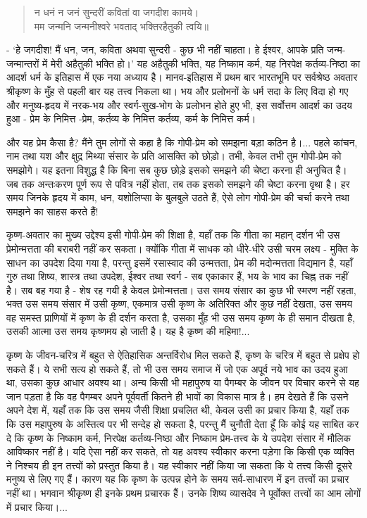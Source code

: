 \begin{verse}
न धनं न जनं सुन्दरीं कवितां वा जगदीश कामये।\\मम जन्मनि जन्मनीश्वरे भवताद् भक्तिरहैतुकी त्वयि॥ 
\end{verse}

- ‘हे जगदीश! मैं धन, जन, कविता अथवा सुन्दरी - कुछ भी नहीं चाहता। हे ईश्वर, आपके प्रति जन्म-जन्मान्तरों में मेरी अहैतुकी भक्ति हो।’ यह अहैतुकी भक्ति, यह निष्काम कर्म, यह निरपेक्ष कर्तव्य-निष्ठा का आदर्श धर्म के इतिहास में एक नया अध्याय है। मानव-इतिहास में प्रथम बार भारतभूमि पर सर्वश्रेष्ठ अवतार श्रीकृष्ण के मुँह से पहली बार यह तत्त्व निकला था। भय और प्रलोभनों के धर्म सदा के लिए विदा हो गए और मनुष्य-हृदय में नरक-भय और स्वर्ग-सुख-भोग के प्रलोभन होते हुए भी, इस सर्वोत्तम आदर्श का उदय हुआ - प्रेम के निमित्त -प्रेम, कर्तव्य के निमित्त कर्तव्य, कर्म के निमित्त कर्म। 

और यह प्रेम कैसा है? मैंने तुम लोगों से कहा है कि गोपी-प्रेम को समझना बड़ा कठिन है।... पहले कांचन, नाम तथा यश और क्षुद्र मिथ्या संसार के प्रति आसक्ति को छोड़ो। तभी, केवल तभी तुम गोपी-प्रेम को समझोगे। यह इतना विशुद्ध है कि बिना सब कुछ छोड़े इसको समझने की चेष्टा करना ही अनुचित है। जब तक अन्तःकरण पूर्ण रूप से पवित्र नहीं होता, तब तक इसको समझने की चेष्टा करना वृथा है। हर समय जिनके हृदय में काम, धन, यशोलिप्सा के बुलबुले उठते हैं, ऐसे लोग गोपी-प्रेम की चर्चा करने तथा समझने का साहस करते हैं! 

कृष्ण-अवतार का मुख्य उद्देश्य इसी गोपी-प्रेम की शिक्षा है, यहाँ तक कि गीता का महान् दर्शन भी उस प्रेमोन्मत्तता की बराबरी नहीं कर सकता। क्योंकि गीता में साधक को धीरे-धीरे उसी चरम लक्ष्य - मुक्ति के साधन का उपदेश दिया गया है, परन्तु इसमें रसास्वाद की उन्मत्तता, प्रेम की मदोन्मत्तता विद्यमान है, यहाँ गुरु तथा शिष्य, शास्त्र तथा उपदेश, ईश्वर तथा स्वर्ग - सब एकाकार हैं, भय के भाव का चिह्न तक नहीं है। सब बह गया है - शेष रह गयी है केवल प्रेमोन्मत्तता। उस समय संसार का कुछ भी स्मरण नहीं रहता, भक्त उस समय संसार में उसी कृष्ण, एकमात्र उसी कृष्ण के अतिरिक्त और कुछ नहीं देखता, उस समय वह समस्त प्राणियों में कृष्ण के ही दर्शन करता है, उसका मुँह भी उस समय कृष्ण के ही समान दीखता है, उसकी आत्मा उस समय कृष्णमय हो जाती है। यह है कृष्ण की महिमा!... 

कृष्ण के जीवन-चरित्र में बहुत से ऐतिहासिक अन्तर्विरोध मिल सकते हैं, कृष्ण के चरित्र में बहुत से प्रक्षेप हो सकते हैं। ये सभी सत्य हो सकते हैं, तो भी उस समय समाज में जो एक अपूर्व नये भाव का उदय हुआ था, उसका कुछ आधार अवश्य था। अन्य किसी भी महापुरुष या पैगम्बर के जीवन पर विचार करने से यह जान पड़ता है कि वह पैगम्बर अपने पूर्ववर्ती कितने ही भावों का विकास मात्र है। हम देखते हैं कि उसने अपने देश में, यहाँ तक कि उस समय जैसी शिक्षा प्रचलित थी, केवल उसी का प्रचार किया है, यहाँ तक कि उस महापुरुष के अस्तित्व पर भी सन्देह हो सकता है, परन्तु मैं चुनौती देता हूँ कि कोई यह साबित कर दे कि कृष्ण के निष्काम कर्म, निरपेक्ष कर्तव्य-निष्ठा और निष्काम प्रेम-तत्त्व के ये उपदेश संसार में मौलिक आविष्कार नहीं है। यदि ऐसा नहीं कर सकते, तो यह अवश्य स्वीकार करना पड़ेगा कि किसी एक व्यक्ति ने निश्चय ही इन तत्त्वों को प्रस्तुत किया है। यह स्वीकार नहीं किया जा सकता कि ये तत्त्व किसी दूसरे मनुष्य से लिए गए हैं। कारण यह कि कृष्ण के उत्पन्न होने के समय सर्व-साधारण में इन तत्त्वों का प्रचार नहीं था। भगवान श्रीकृष्ण ही इनके प्रथम प्रचारक हैं। उनके शिष्य व्यासदेव ने पूर्वोक्त तत्त्वों का आम लोगों में प्रचार किया।... 

